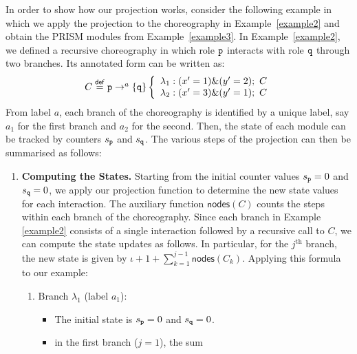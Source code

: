 \begin{example}\label{example-proj}
  In order to show how our projection works, consider the following
  example in which we apply the projection to the choreography in
  Example~\ref{example2} and obtain the PRISM modules from
  Example~\ref{example3}.
  In Example \ref{example2}, we defined a recursive choreography in
  which role \(\mathtt{p}\) interacts with role \(\mathtt{q}\) through two
  branches. Its annotated form can be written as:
  \begin{displaymath}
    \begin{array}{lll}
      C \stackrel{\mathsf{def}}{=} \mathtt{p}\rightarrow^{a} \{\mathtt{q}\}
      \left\{
      \begin{array}{lll}
        \lambda_1: (x'=1)\&(y'=2);\ C
        \\
        \lambda_2: (x'=3)\&(y'=1);\ C
      \end{array}
      \right.
    \end{array}
  \end{displaymath}
  From label $a$, each branch of the choreography is identified by a
  unique label, say \(a_1\) for the first branch and \(a_2\) for the
  second. Then, the state of each module can be tracked by counters
  \(s_{\mathtt{p}}\) and \(s_{\mathtt{q}}\).
  The various steps of the projection can then be summarised as
  follows:
  \begin{enumerate}
  \item \textbf{Computing the States.} Starting from the initial
    counter values \( s_{\mathtt{p}} = 0 \) and \( s_{\mathtt{q}} = 0 \),
    we apply our projection function to determine the new state values
    for each interaction. The auxiliary function \(\mathsf{nodes}(C)\)
    counts the steps within each branch of the choreography. Since
    each branch in Example \ref{example2} consists of a single
    interaction followed by a recursive call to \(C\), we can compute
    the state updates as follows.
    In particular, for the \(j^{\text{th}}\) branch, the new state is
    given by $ \iota + 1 + \sum_{k=1}^{j-1} \mathsf{nodes}(C_k) $.
    Applying this formula to our example:
    \begin{enumerate}
    \item Branch \(\lambda_1\) (label \(a_1\)):
      \begin{itemize}
      \item The initial state is \( s_{\mathtt{p}} = 0 \) and
        \( s_{\mathtt{q}} = 0 \).
      \item in the first branch ($j=1$), the sum

\end{itemize}
\end{enumerate}
\end{enumerate}
\end{example}
